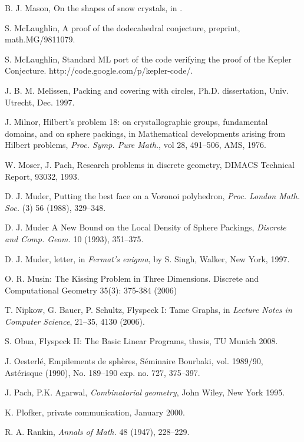 \begin{thebibliography}{CHMS94}
 B. J. Mason, On the shapes of snow crystals, in \cite{Kep66}.

 S. McLaughlin, A proof of the dodecahedral conjecture,
    preprint, math.MG/9811079.

 S. McLaughlin, Standard ML port of the code
verifying the proof of the Kepler Conjecture.
http://code.google.com/p/kepler-code/.

 J. B. M. Melissen, Packing and covering with circles,
    Ph.D. dissertation, Univ. Utrecht, Dec. 1997.

 J. Milnor, Hilbert's problem 18: on crystallographic groups,
    fundamental domains, and on sphere packings, in
    Mathematical developments arising from Hilbert problems,
    {\it Proc. Symp. Pure Math.}, vol 28, 491--506, AMS, 1976.

 W. Moser, J. Pach, Research problems in discrete geometry,
    DIMACS Technical Report, 93032, 1993.

 D. J. Muder, Putting the best face on a Voronoi polyhedron,
    {\it Proc. London Math. Soc.} (3) 56 (1988), 329--348.


  D. J. Muder A New Bound on the Local Density
of Sphere Packings, {\it Discrete and Comp. Geom.} 10 (1993),
351--375.

  D. J. Muder, letter, in {\it Fermat's enigma}, by S. Singh,
        Walker, New York, 1997.

  O. R. Musin: The Kissing Problem in Three Dimensions. Discrete and Computational Geometry 35(3): 375-384 (2006)

  T. Nipkow, G. Bauer, P. Schultz, Flyspeck I: Tame Graphs, in
{\it Lecture Notes in Computer Science}, 21--35, 4130 (2006). 

  S. Obua, Flyspeck II: The Basic Linear Programs,
thesis, TU Munich 2008.

 J. Oesterl\'e,  Empilements de sph\`eres,
    S\'eminaire Bourbaki, vol. 1989/90, Ast\'erisque (1990),
        No. 189--190 exp. no. 727, 375--397.

 J. Pach, P.K. Agarwal, {\it Combinatorial geometry}, John Wiley,
    New York 1995.

  K. Plofker, private communication, January 2000.

 R. A. Rankin, {\it Annals of Math.} 48 (1947), 228--229.



\end{thebibliography}
